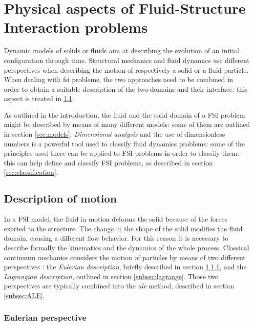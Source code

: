 \chapter{Physical aspects of Fluid-Structure Interaction problems}
\label{cha:physics}


Dynamic models of solids or fluids aim at describing the evolution of an initial configuration through time. Structural mechanics and fluid dynamics use different perspectives when describing the motion of respectively a solid or a fluid particle. When dealing with \acrshort{fsi} problems, the two approaches need to be combined in order to obtain a suitable description of the two domains and their interface: this aspect is treated in \ref{sec:desc-motion}.

As outlined in the introduction, the fluid and the solid domain of a FSI problem might be described by means of many different models: some of them are outlined in section \ref{sec:models}.  \textit{Dimensional analysis} and the use of dimensionless numbers is a powerful tool used to classify fluid dynamics problems: some of the principles used there can be applied to FSI problems in order to classify them: this can help define and classify FSI problems, as described in section \ref{sec:classification}.

\section{Description of motion}
\label{sec:desc-motion}

In a FSI model, the fluid in motion deforms the solid because of the forces exerted to the structure. The change in the shape of the solid modifies the fluid domain, causing a different flow behavior. For this reason it is necessary to describe formally the kinematics and the dynamics of the whole process. Classical continuum mechanics considers the motion of particles by means of two different perspectives  \cite{batra2006elements}: the \textit{Eulerian description}, briefly described in section \ref{subsec:euler}, and the \textit{Lagrangian description}, outlined in section \ref{subsec:lagrange}. Those two perspectives are typically combined into the \textit{\acrfull{ale}} method, described in section \ref{subsec:ALE}.

\subsection{Eulerian perspective}
\label{subsec:euler}

